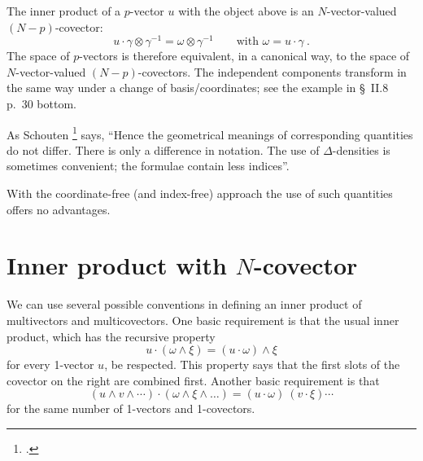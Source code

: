 \documentclass[\ifafour a4paper,12pt,\else a5paper,10pt,\fi%
onecolumn,oneside,article,%
british%
]{memoir}
\theoremstyle{remark}
\theoremstyle{innote}
\newcommand*{\citey}{\footcites}%
\renewcommand*{\|}[1][]{\nonscript\:#1\vert\nonscript\:\mathopen{}}
\newcommand*{\sect}{\S}%
\begin{document}
The inner product of a $p$-vector $u$ with the object above is an
$N$-vector-valued $(N-p)$-covector:
\begin{equation}
  \label{eq:hypervolume-valued-covector}
  u \cdot \gamma \otimes \gamma^{-1} = \omega \otimes \gamma^{-1}
  \qquad \text{with } \omega = u \cdot \gamma \ .
\end{equation}
The space of $p$-vectors is therefore equivalent, in a canonical way, to
the space of $N$-vector-valued $(N-p)$-covectors. The independent
components transform in the same way under a change of basis/coordinates;
see the example in \textcite{schouten1951_r1989} \sect~II.8 p.~30 bottom.

As Schouten \citey[\sect~II.8 p.~30]{schouten1951_r1989} says,
\enquote{Hence the geometrical meanings of corresponding quantities do not
  differ. There is only a difference in notation. \textelp{} The use of
  $\Delta$-densities is sometimes convenient; \textelp{} the formulae
  contain less indices}.

With the coordinate-free (and index-free) approach the use of such
quantities offers no advantages.


\section{Inner product with $N$-covector}
\label{sec:inner_volume}

We can use several possible conventions in defining an inner product of
multivectors and multicovectors. One basic requirement is that the usual
inner product, which has the recursive property
\begin{equation}
  \label{eq:basic_inner_prod}
  u \cdot (\omega\land \xi) = (u \cdot \omega)\land \xi 
\end{equation}
for every 1-vector $u$, be respected. This property says that the first
slots of the covector on the right are combined first. Another basic
requirement is that
\begin{equation}
  \label{eq:basic_inner_prod_volumes}
  (u \land v \land \dotsb) \cdot (\omega\land \xi \land \dots) = (u \cdot
  \omega)\ (v \cdot \xi) \dotsm
\end{equation}
for the same number of 1-vectors and 1-covectors.
\end{document}
